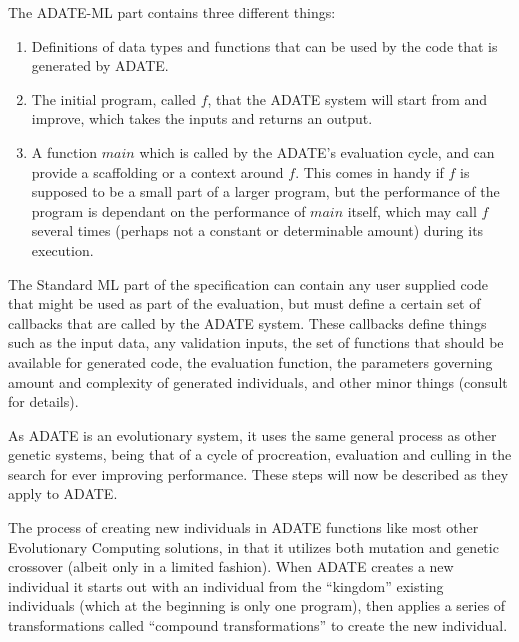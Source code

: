 \documentclass[]{report}
\begin{document}
The ADATE-ML part contains three different things:
\begin{enumerate}
\item Definitions of data types and functions that can be used by the code that
  is generated by ADATE.
\item The initial program, called \(f\), that the ADATE system will start from
  and improve, which takes the inputs and returns an output.
\item A function \(main\) which is called by the ADATE's evaluation cycle, and
  can provide a scaffolding or a context around \(f\). This comes in handy
  if \(f\) is supposed to be a small part of a larger program, but the
  performance of the program is dependant on the performance of \(main\)
  itself, which may call \(f\) several times (perhaps not a constant or
  determinable amount) during its execution.
\end{enumerate}

The Standard ML part of the specification can contain any user supplied code
that might be used as part of the evaluation, but must define a certain set of
callbacks that are called by the ADATE system. These callbacks define things
such as the input data, any validation inputs, the set of functions that should
be available for generated code, the evaluation function, the parameters
governing amount and complexity of generated individuals, and other minor things
(consult \citet[sect.~4.2]{vattekar2006adate} for details).

As ADATE is an evolutionary system, it uses the same general process as other
genetic systems, being that of a cycle of procreation, evaluation and culling in
the search for ever improving performance. These steps will now be described as
they apply to ADATE.

The process of creating new individuals in ADATE functions like most other
Evolutionary Computing solutions, in that it utilizes both mutation and genetic
crossover (albeit only in a limited fashion). When ADATE creates a new
individual it starts out with an individual from the ``kingdom'' existing
individuals (which at the beginning is only one program), then applies a series
of transformations called ``compound transformations'' to create the new
individual.
\end{document}
